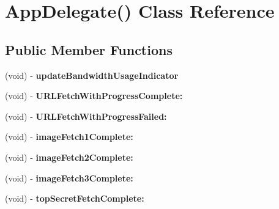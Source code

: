 \hypertarget{interface_app_delegate_07_08}{
\section{\-App\-Delegate() \-Class \-Reference}
\label{interface_app_delegate_07_08}
}
\subsection*{\-Public \-Member \-Functions}
\begin{DoxyCompactItemize}
\item 
\hypertarget{interface_app_delegate_07_08_a74fe7eb4eb69838d205c611f52b6326e}{
(void) -\/ {\bfseries update\-Bandwidth\-Usage\-Indicator}}
\label{interface_app_delegate_07_08_a74fe7eb4eb69838d205c611f52b6326e}

\item 
\hypertarget{interface_app_delegate_07_08_a30f0114b3d2c53b319aa52c0676e5170}{
(void) -\/ {\bfseries \-U\-R\-L\-Fetch\-With\-Progress\-Complete\-:}}
\label{interface_app_delegate_07_08_a30f0114b3d2c53b319aa52c0676e5170}

\item 
\hypertarget{interface_app_delegate_07_08_a514b2702b9a9d464e7d3fea052f03aca}{
(void) -\/ {\bfseries \-U\-R\-L\-Fetch\-With\-Progress\-Failed\-:}}
\label{interface_app_delegate_07_08_a514b2702b9a9d464e7d3fea052f03aca}

\item 
\hypertarget{interface_app_delegate_07_08_ade930c52b5535a29172d51bfa21a5992}{
(void) -\/ {\bfseries image\-Fetch1\-Complete\-:}}
\label{interface_app_delegate_07_08_ade930c52b5535a29172d51bfa21a5992}

\item 
\hypertarget{interface_app_delegate_07_08_ad3faea8b1ccf1678112b692681b0a0f4}{
(void) -\/ {\bfseries image\-Fetch2\-Complete\-:}}
\label{interface_app_delegate_07_08_ad3faea8b1ccf1678112b692681b0a0f4}

\item 
\hypertarget{interface_app_delegate_07_08_a529d0776c3f0a9fc82d1b914e134574e}{
(void) -\/ {\bfseries image\-Fetch3\-Complete\-:}}
\label{interface_app_delegate_07_08_a529d0776c3f0a9fc82d1b914e134574e}

\item 
\hypertarget{interface_app_delegate_07_08_a5aabd9eddc120b2b0596ad9e16a6e550}{
(void) -\/ {\bfseries top\-Secret\-Fetch\-Complete\-:}}
\label{interface_app_delegate_07_08_a5aabd9eddc120b2b0596ad9e16a6e550}


\end{DoxyCompactItemize}
